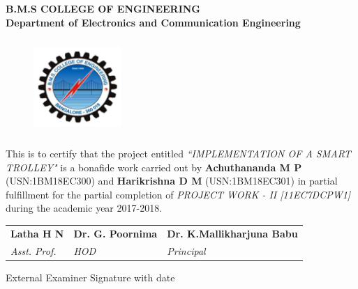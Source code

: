 
\vspace*{1.5cm}

\begin{center}

\vspace*{2mm} \fontsize{14pt}{16.8pt}\selectfont\textbf{B.M.S COLLEGE OF ENGINEERING} \\
\vspace*{2mm}
\fontsize{14pt}{16.8pt}\selectfont\textbf{Department of Electronics and Communication Engineering} 
\vspace*{10mm}\\

\begin{figure}[!ht]
\centering
\includegraphics[height=36.068mm,width=33.274mm]{figures/BMS_Logo.png}
\end{figure}

\end{center}

\noindent This is to certify that the project entitled \textit{``IMPLEMENTATION OF A SMART TROLLEY"} is a bonafide work carried out by \textbf{Achuthananda M P} (USN:1BM18EC300) and \textbf{Harikrishna D M} (USN:1BM18EC301) in partial fulfillment for the partial completion of \textit{PROJECT WORK - II [11EC7DCPW1]} during the academic year 2017-2018.
 

\vspace*{2.5cm} 

\begin{tabular}{p{5cm}p{5cm}p{5cm}}
\textbf{Latha H N} & \textbf{Dr. G. Poornima} & \textbf{Dr. K.Mallikharjuna Babu} \\
{\fontsize{12pt}{14pt}\selectfont\textit{Asst. Prof.}} &  {\fontsize{12pt}{14pt}\selectfont\textit{HOD}} & {\fontsize{12pt}{14pt}\selectfont\textit{Principal}} 

\end{tabular}
 
\vspace*{2.5cm}

External Examiner \hfill Signature with date
